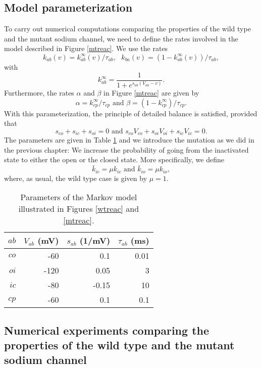 \subsection{Model parameterization}

To carry out numerical computations comparing the properties
of the  wild type and the mutant sodium channel, we need to define
the rates involved in the model described in Figure \ref{mtreac}. We use the 
rates
\[  k_{ab}(v) = k^{\infty}_{ab}(v)/\tau_{ab}, \ \ \  k_{ba}(v) = (1-k^{\infty}_{ab}(v))/\tau_{ab}, \]
with
\[k^{\infty}_{ab} = \frac{1}{1+e^{s_{a\!b}(V_{a\!b}-v)}}. \]
Furthermore, the rates $\alpha$ and $\beta$ in Figure \ref{mtreac} are given by
\[
\alpha =k^{\infty}_{cp}/\tau_{cp}  \text{ and } \beta =(1-k^{\infty}_{cp})/\tau_{cp}.
\]
With this parameterization, the principle of detailed balance is satisfied, provided that
\[ 
s_{co} + s_{ic} + s_{oi}=0 \mbox{\ \ and\ \ } s_{co}V_{co} + s_{oi}V_{oi} + s_{ic}V_{ic}  =0.  \]
The parameters are given in Table \ref{markov_rates} and we introduce the mutation as we
did in the previous chapter: We increase the probability of going from the
inactivated state to either the open or the closed state. More specifically, we define
\[
\bar{k}_{ic} = \mu k_{ic}  \text{ and } \bar{k}_{io} = \mu k_{io},
\] where, as usual, the wild type case is given by $\mu=1$. 

\begin{table}  \begin{center}
\begin{tabular}{|r|r|r|r|} \hline
$ab$ & $V_{ab}$ (mV) & $s_{ab}$ (1/mV) &  $\tau_{ab}$ (ms)\\ \hline
$co$ & -60 & 0.1& 0.01\\ \hline
$oi$ & -120 & 0.05 & 3 \\  \hline
$ic$ & -80 & -0.15& 10\\ \hline
$cp$ &-60 & 0.1& 0.1\\ \hline
\end{tabular} \end{center}
\caption{Parameters of the Markov model illustrated in Figures \ref{wtreac} 
and \ref{mtreac}. 
} 
\label{markov_rates} 
\end{table}

\subsection{Numerical experiments comparing the properties of the wild type 
and the mutant sodium channel}



